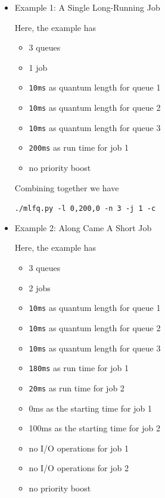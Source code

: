\documentclass[12pt]{article}
\begin{document}
\begin{enumerate}[1.]
    \bigskip

    \begin{itemize}
        \item Example 1: A Single Long-Running Job

        \bigskip

        Here, the example has

        \begin{itemize}
            \item 3 queues
            \item 1 job
            \item \texttt{10ms} as quantum length for queue 1
            \item \texttt{10ms} as quantum length for queue 2
            \item \texttt{10ms} as quantum length for queue 3
            \item \texttt{200ms} as run time for job 1
            \item no priority boost
        \end{itemize}

        \bigskip

        Combining together we have

        \bigskip

        \texttt{./mlfq.py -l 0,200,0 -n 3 -j 1 -c}

        \bigskip

        \item Example 2: Along Came A Short Job

        \bigskip

        Here, the example has

        \begin{itemize}
            \item 3 queues
            \item 2 jobs
            \item \texttt{10ms} as quantum length for queue 1
            \item \texttt{10ms} as quantum length for queue 2
            \item \texttt{10ms} as quantum length for queue 3
            \item \texttt{180ms} as run time for job 1
            \item \texttt{20ms} as run time for job 2
            \item 0ms as the starting time for job 1
            \item 100ms as the starting time for job 2
            \item no I/O operations for job 1
            \item no I/O operations for job 2
            \item no priority boost
        \end{itemize}


\end{itemize}
\end{enumerate}
\end{document}
